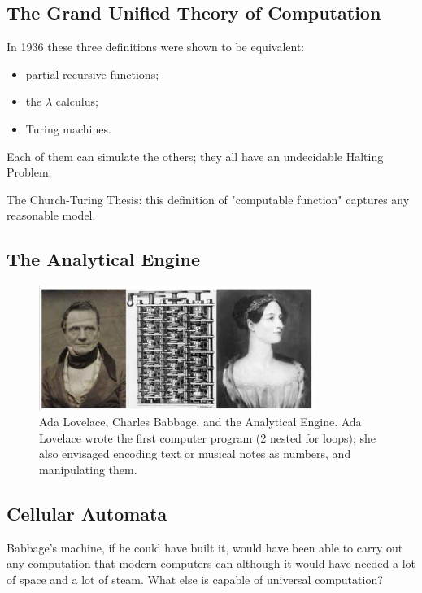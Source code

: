 \documentclass[]{article}
\begin{document}
\subsection{The Grand Unified Theory of Computation}

In 1936 these three definitions were shown to be equivalent:

\begin{itemize}
	\item partial recursive functions;
	\item the $\lambda$ calculus;
	\item Turing machines.
\end{itemize}

Each of them can simulate the others; they all have an undecidable Halting Problem.

The Church-Turing Thesis: this definition of "computable function" captures any reasonable model.

\subsection{The Analytical Engine}

\begin{figure}[H]
	\begin{center}
		\caption[Ada Lovelace, Charles Babbage, and the Analytical Engine]{Ada Lovelace, Charles Babbage, and the Analytical Engine. Ada Lovelace wrote the first computer program (2 nested for loops); she also envisaged encoding text or musical notes as numbers, and manipulating them.}\label{fig:BabbageLovelace}
		\includegraphics[width=0.8\textwidth]{BabbageLovelace}
	\end{center}
\end{figure}

\subsection{Cellular Automata}

Babbage's machine, if he could have built it, would have been able to carry out any computation that modern computers can although it would have needed a lot of space and a lot of steam. What else is capable of universal computation?
\end{document}
